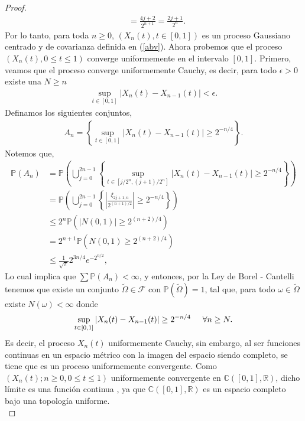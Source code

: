 \begin{proof}
\begin{align*}
	& = \frac{4j + 2}{2^{n+1}} = \frac{2j + 1}{2^n}.
	\end{align*}
Por lo tanto, para toda $n \geq 0$, $(X_n (t), t \in [0, 1])$ es un proceso Gaussiano centrado y de covarianza definida en (\ref{abv}). Ahora probemos que el proceso $(X_n (t), 0 \leq t \leq 1)$ converge uniformemente en el intervalo $[0, 1]$. Primero, veamos que el proceso converge uniformemente Cauchy, es decir, para todo $\epsilon > 0$ existe una $N \geq n$
	\begin{align*}
		\sup_{t \in [0, 1]} |X_n (t) - X_{n-1} (t)| < \epsilon.
	\end{align*}
Definamos los siguientes conjuntos, 
	\begin{align*}
		A_n = \left\{ \sup_{t \in [0, 1]} |X_n (t) - X_{n-1} (t)| \geq 2^{-n / 4} \right\}.
	\end{align*}
Notemos que, 
	\begin{align*}
		\mathbb{P}(A_n) & = \mathbb{P} \left( \bigcup_{j = 0}^{2n - 1} \left\{ \sup_{t \in [j/2^n, (j+1)/2^n]} |X_n (t) - X_{n-1} (t)| \geq 2^{-n / 4} \right\} \right) \\
		& = \mathbb{P} \left( \bigcup_{j = 0}^{2n - 1} \left\{ |\frac{\xi_{2j+1, n}}{2^{(n+1)/2}}| \geq 2^{-n / 4} \right\} \right) \\
		& \leq 2^n \mathbb{P}\left( |N(0, 1)| \geq 2^{(n+2)/4} \right) \\
		& = 2^{n+1} \mathbb{P}\left( N(0, 1) \geq 2^{(n+2)/4} \right) \\
		& \leq \frac{1}{\sqrt{\pi}} 2^{3n/4} e^{-2^{n/2}},
	\end{align*}
Lo cual implica que $\sum \mathbb{P}(A_n) < \infty$, y entonces, por la Ley de Borel - Cantelli tenemos que existe un conjunto $\tilde{\Omega} \in \mathcal{F}$ con $\mathbb{P}(\tilde{\Omega}) = 1$, tal que, para todo $\omega \in \tilde{\Omega}$ existe $N(\omega) < \infty$ donde
	\begin{align*}
		\sup_{t \in [0, 1]} |X_n (t) - X_{n-1} (t)| \geq 2^{-n / 4} \hspace{0.5cm} \forall n \geq N.
	\end{align*}
Es decir, el proceso $X_n (t)$ uniformemente Cauchy, sin embargo, al ser funciones continuas en un espacio métrico con la imagen del espacio siendo completo, se tiene que es un proceso uniformemente convergente. Como $(X_n (t); n \geq 0, 0 \leq t \leq 1)$ uniformemente convergente en $\mathbb{C}([0, 1], \mathbb{R})$, dicho límite es una función continua , ya que $\mathbb{C}([0, 1], \mathbb{R})$ es un espacio completo bajo una topología uniforme. \\


\end{proof}
